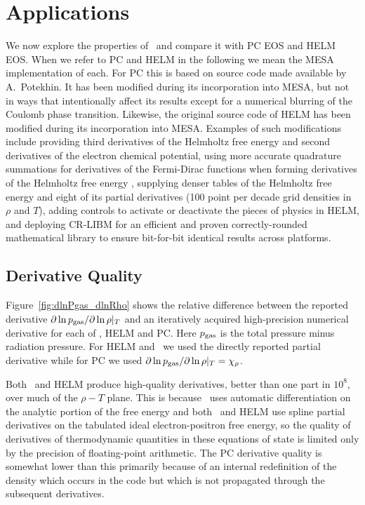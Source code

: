 \section{Applications}\label{sec:examples}

We now explore the properties of \skye\ and compare it with PC EOS and HELM EOS.
When we refer to PC and HELM in the following we mean the MESA implementation
of each.  For PC this is based on source code made available by
A.~Potekhin.  It has been modified during its incorporation into MESA,
but not in ways that intentionally affect its results except for a
numerical blurring of the Coulomb phase transition. Likewise, the original source code of HELM
has been modified during its incorporation into MESA. Examples of such modifications include
providing third derivatives of the Helmholtz free energy and second derivatives
of the electron chemical potential,
using more accurate quadrature summations for derivatives of the Fermi-Dirac functions
when forming derivatives of the Helmholtz free energy \citep{gong_2001_aa},
supplying denser tables of the Helmholtz free energy and eight of its partial derivatives
(100 point per decade grid densities in $\rho$ and $T$), 
adding controls to activate or deactivate the pieces of physics in HELM, 
and deploying CR-LIBM \citep{CR-LIBM} for an efficient and proven correctly-rounded mathematical library
to ensure bit-for-bit identical results across platforms.

\subsection{Derivative Quality}

Figure~\ref{fig:dlnPgas_dlnRho} shows the relative difference between the reported derivative $\partial \ln p_{\rm gas}/\partial \ln \rho|_T$ and an iteratively acquired high-precision numerical derivative \citep[e.g.,][]{ridders_1982_aa,press_1992_aa} for each of \skye, HELM and PC.
Here $p_{\rm gas}$ is the total pressure minus radiation pressure.
For HELM and \skye\ we used the directly reported partial derivative while for PC we used $\partial \ln p_{\rm gas}/\partial \ln \rho|_T = \chi_\rho$.

Both \skye\ and HELM produce high-quality derivatives, better than one part in $10^{8}$, over much of the $\rho-T$ plane.
This is because \skye\ uses automatic differentiation on the analytic portion of the free energy and both \skye\ and HELM use spline partial derivatives on the tabulated ideal electron-positron free energy, so the quality of derivatives of thermodynamic quantities in these equations of state is limited only by the precision of floating-point arithmetic.
The PC derivative quality is somewhat lower than this primarily because of an internal redefinition of the density which occurs in the code but which is not propagated through the subsequent derivatives.

